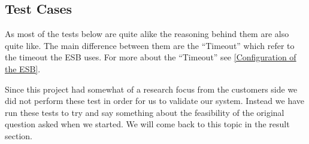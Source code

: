 	\subsection{Test Cases}\label{Testing:Cases}

	As most of the tests below are quite alike the reasoning behind them are also quite like. The main difference between them are the “Timeout” which refer to the timeout the ESB uses. For more about the “Timeout” see \ref{Configuration of the ESB}.

	Since this project had somewhat of a research focus from the customers side we did not perform these test in order for us to validate our system. Instead we have run these tests to try and say something about the feasibility of the original question asked when we started. We will come back to this topic in the result section.
	

